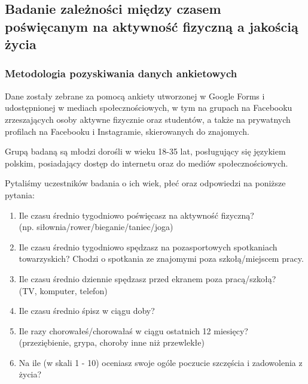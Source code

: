 \documentclass[12pt,a4paper]{article}
\begin{document}
\vspace{8mm}

\subsection{Badanie zależności między czasem poświęcanym na aktywność fizyczną a jakością życia}

\vspace{5mm}

\subsubsection{Metodologia pozyskiwania danych ankietowych}
Dane zostały zebrane za pomocą ankiety utworzonej w Google Forms i udostępnionej w mediach społecznościowych, w tym na grupach na Facebooku zrzeszających osoby aktywne fizycznie oraz studentów, a także na prywatnych profilach na Facebooku i Instagramie, skierowanych do znajomych.

\vspace{3mm}

Grupą badaną są młodzi dorośli w wieku 18-35 lat, posługujący się językiem polskim, posiadający dostęp do internetu oraz do mediów społecznościowych.

\newpage
Pytaliśmy uczestników badania o ich wiek, płeć oraz odpowiedzi na poniższe pytania:
\begin{enumerate}
    \item {Ile czasu średnio tygodniowo poświęcasz na aktywność fizyczną? \\ (np. siłownia/rower/bieganie/taniec/joga)}
    \item Ile czasu średnio tygodniowo spędzasz na pozasportowych spotkaniach towarzyskich? Chodzi o spotkania ze znajomymi poza szkołą/miejscem pracy.
    \item {Ile czasu średnio dziennie spędzasz przed ekranem poza pracą/szkołą? \\ 
    (TV, komputer, telefon)}
    \item Ile czasu średnio śpisz w ciągu doby?
    \item {Ile razy chorowałeś/chorowałaś w ciągu ostatnich 12 miesięcy? \\
    (przeziębienie, grypa, choroby inne niż przewlekłe)}
    \item Na ile (w skali 1 - 10) oceniasz swoje ogóle poczucie szczęścia i zadowolenia z życia?
\end{enumerate}
\vspace{4mm}
\end{document}
